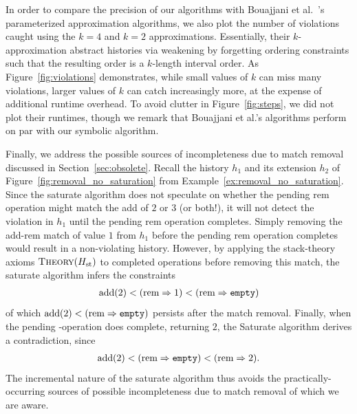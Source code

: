 In order to compare the precision of our algorithms with Bouajjani et
al.~\cite{conf/popl/BouajjaniEEH15}’s parameterized approximation algorithms,
we also plot the number of violations caught using the $k=4$ and $k=2$
approximations. Essentially, their $k$-approximation abstract histories via
weakening by forgetting ordering constraints such that the resulting order is a
$k$-length interval order. As Figure~\ref{fig:violations} demonstrates, while
small values of $k$ can miss many violations, larger values of $k$ can catch
increasingly more, at the expense of additional runtime overhead. To avoid
clutter in Figure~\ref{fig:steps}, we did not plot their runtimes, though we
remark that Bouajjani et al.’s algorithms perform on par with our {\sc
symbolic} algorithm.

Finally, we address the possible sources of incompleteness due to match removal
discussed in Section~\ref{sec:obsolete}. Recall the history $h_1$ and its
extension $h_2$ of Figure~\ref{fig:removal_no_saturation} from
Example~\ref{ex:removal_no_saturation}. Since the {\sc saturate} algorithm does
not speculate on whether the pending rem operation might match the 
add of $2$ or $3$ (or both!), it will not detect the violation in $h_1$ until
the pending rem operation completes. Simply removing the add-rem
match of value $1$ from $h_1$ before the pending rem operation
completes would result in a non-violating history. However, by applying the
stack-theory axioms $\textsc{Theory}(H_\mathrm{st})$ to completed operations
before removing this match, the {\sc saturate} algorithm infers the constraints
\begin{align*}
  \text{add}(2) < (\text{rem} \Rightarrow 1) < (\text{rem} \Rightarrow {\tt empty})
\end{align*}
of which $\text{add}(2) < (\text{rem} \Rightarrow {\tt empty})$ persists after the
match removal. Finally, when the pending -operation does complete,
returning $2$, the {\sc Saturate} algorithm derives a contradiction, since
\begin{align*}
  \text{add}(2) < (\text{rem} \Rightarrow {\tt empty}) < (\text{rem} \Rightarrow 2).
\end{align*}
The incremental nature of the {\sc saturate} algorithm thus avoids the
practically-occurring sources of possible incompleteness due to match removal
of which we are aware.
